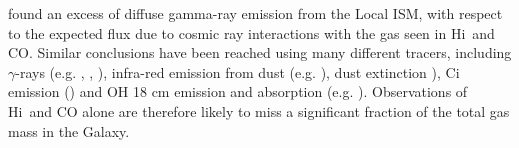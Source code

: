 \documentclass[preprint]{emulateapj}
\def\hi{H{\sc i}}
\begin{document}
found an excess of diffuse gamma-ray emission from the Local ISM, with respect to the expected flux due to cosmic ray interactions with the gas seen in \hi\ and CO. %
Similar conclusions have been reached using many different tracers, including $\gamma$-rays %
(e.g. \citealt{Abdo2010}, \citealt{Ackermann2012}, \citealt{Ackermann2011}), infra-red emission from dust (e.g. \citealt{Blitz1990, Reach1994, Douglas2007, PLC2011, PLC2014}), dust extinction \citep[e.g.][]{Paradis2012, Lee2015}), C{\sc i} emission (\citealt{Pineda2013, Langer2014}) and OH 18 cm emission and absorption (e.g. \citealt{Wannier93, Liszt1996, Barriault2010, Allen2012, Allen2015}). Observations of \hi\ and CO alone are therefore likely to miss a significant fraction of the total gas mass in the Galaxy.
\end{document}
